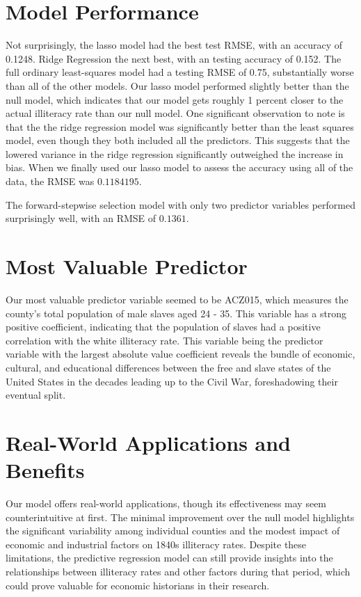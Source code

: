 \documentclass[a4paper,12pt]{article}
\begin{document}
\section{Model Performance}
Not surprisingly, the lasso model had the best test RMSE, with an accuracy of  0.1248. Ridge Regression the next best, with an testing accuracy of 0.152. The full ordinary least-squares model had a testing RMSE of 0.75, substantially worse than all of the other models. Our lasso model performed slightly better than the null model, which indicates that our model gets roughly 1 percent closer to the actual illiteracy rate than our null model. One significant observation to note is that the the ridge regression model was significantly better than the least squares model, even though they both included all the predictors. This suggests that the lowered variance in the ridge regression significantly outweighed the increase in bias. 
When we finally used our lasso model to assess the accuracy using all of the data, the RMSE was $0.1184195$.


The forward-stepwise selection model with only two predictor variables performed surprisingly well, with an RMSE of $0.1361$.



\section{Most Valuable Predictor}
Our most valuable predictor variable seemed to be ACZ015, which measures the county's total population of male slaves aged 24 - 35. This variable has a strong positive coefficient, indicating that the population of slaves had a positive correlation with the white illiteracy rate. This variable being the predictor variable with the largest absolute value coefficient reveals the bundle of economic, cultural, and educational differences between the free and slave states of the United States in the decades leading up to the Civil War, foreshadowing their eventual split.


\section{Real-World Applications and Benefits}
Our model offers real-world applications, though its effectiveness may seem counterintuitive at first. The minimal improvement over the null model highlights the significant variability among individual counties and the modest impact of economic and industrial factors on 1840s illiteracy rates. Despite these limitations, the predictive regression model can still provide insights into the relationships between illiteracy rates and other factors during that period, which could prove valuable for economic historians in their research.
\end{document}
